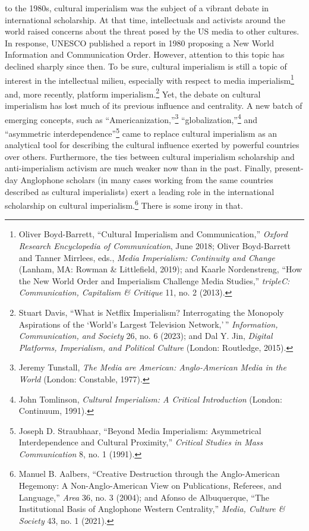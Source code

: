 \documentclass{tufte-handout}
\begin{document}

 to the 1980s, cultural imperialism was the subject of a
vibrant debate in international scholarship. At that time, intellectuals
and activists around the world raised concerns about the threat posed by
the US media to other cultures. In response, UNESCO published a report
in 1980 proposing a New World Information and Communication Order.
However, attention to this topic has declined sharply since then. To be
sure, cultural imperialism is still a topic of interest in the
intellectual milieu, especially with respect to media
imperialism\footnote{Oliver Boyd-Barrett, ``Cultural Imperialism and
  Communication,'' \emph{Oxford Research Encyclopedia of Communication},
  June 2018; Oliver Boyd-Barrett and Tanner Mirrlees, eds., \emph{Media
  Imperialism: Continuity and Change} (Lanham, MA: Rowman \&
  Littlefield, 2019); and Kaarle Nordenstreng, ``How the New World Order
  and Imperialism Challenge Media Studies,'' \emph{tripleC:
  Communication, Capitalism \& Critique} 11, no. 2 (2013).} and, more
recently, platform imperialism.\footnote{Stuart Davis, ``What is Netflix
  Imperialism? Interrogating the Monopoly Aspirations of the `World's
  Largest Television Network,'\,'' \emph{Information, Communication, and
  Society} 26, no. 6 (2023); and Dal Y. Jin, \emph{Digital Platforms,
  Imperialism, and Political Culture} (London: Routledge, 2015).} Yet,
the debate on cultural imperialism has lost much of its previous
influence and centrality. A new batch of emerging concepts, such as
``Americanization,''\footnote{Jeremy Tunstall, \emph{The Media are
  American: Anglo-American Media in the World} (London: Constable,
  1977).} ``globalization,''\footnote{John Tomlinson, \emph{Cultural
  Imperialism: A Critical Introduction} (London: Continuum, 1991).} and
``asymmetric interdependence''\footnote{Joseph D. Straubhaar, ``Beyond Media
  Imperialism: Asymmetrical Interdependence and Cultural Proximity,''
  \emph{Critical Studies in Mass Communication} 8, no. 1
  (1991).}
came to replace cultural imperialism as an analytical tool for
describing the cultural influence exerted by powerful countries over
others. Furthermore, the ties between cultural imperialism scholarship
and anti-imperialism activism are much weaker now than in the past.
Finally, present-day Anglophone scholars (in many cases working from the
same countries described as cultural imperialists) exert a leading role
in the international scholarship on cultural imperialism.\footnote{Manuel
  B. Aalbers, ``Creative Destruction through the Anglo-American
  Hegemony: A Non-Anglo-American View on Publications, Referees, and
  Language,'' \emph{Area} 36, no. 3 (2004); and Afonso de Albuquerque,
  ``The Institutional Basis of Anglophone Western Centrality,''
  \emph{Media, Culture \& Society} 43, no. 1 (2021).} There is some
irony in that.
\end{document}
